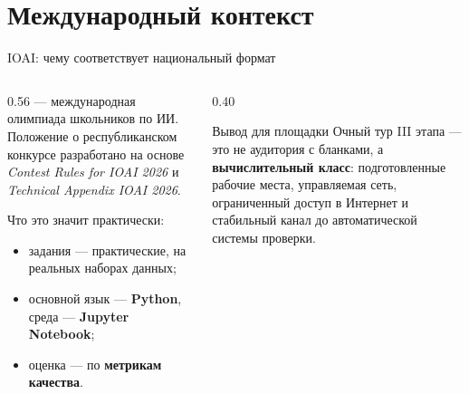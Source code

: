 \section{Международный контекст}

\begin{frame}{IOAI: чему соответствует национальный формат}
  \begin{columns}[T]
    \begin{column}{0.56\textwidth}
       ---
      международная олимпиада школьников по ИИ. Положение о республиканском
      конкурсе разработано на основе
      \emph{Contest Rules for IOAI 2026} и \emph{Technical Appendix IOAI 2026}.

      \medskip
      Что это значит практически:
      \begin{itemize}\setlength\itemsep{0.35em}
        \item задания --- практические, на реальных наборах данных;
        \item основной язык --- \textbf{Python}, среда --- \textbf{Jupyter Notebook};
        \item оценка --- по \textbf{метрикам качества}.
      \end{itemize}
    \end{column}
    \begin{column}{0.40\textwidth}
      \begin{block}{Вывод для площадки}
        Очный тур III этапа --- это не аудитория с бланками, а
        \textbf{вычислительный класс}: подготовленные рабочие места,
        управляемая сеть, ограниченный доступ в Интернет
        и стабильный канал до автоматической системы проверки.
      \end{block}
    \end{column}
  \end{columns}
\end{frame}
